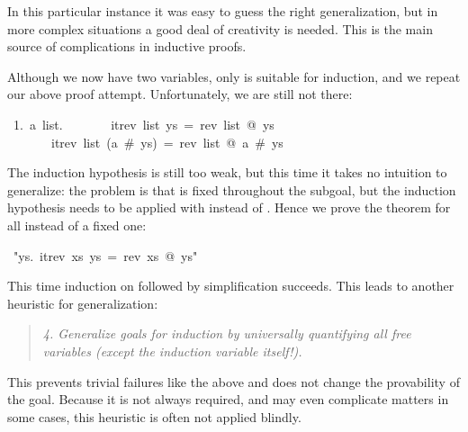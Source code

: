 \begin{isabelle}
\begin{isamarkuptxt}
In this particular instance it was easy to guess the right generalization,
but in more complex situations a good deal of creativity is needed. This is
the main source of complications in inductive proofs.

Although we now have two variables, only  is suitable for
induction, and we repeat our above proof attempt. Unfortunately, we are still
not there:
\begin{isabellepar}%
~1.~{\isasymAnd}a~list.\isanewline
~~~~~~~itrev~list~ys~=~rev~list~@~ys~{\isasymLongrightarrow}\isanewline
~~~~~~~itrev~list~(a~\#~ys)~=~rev~list~@~a~\#~ys%
\end{isabellepar}%
The induction hypothesis is still too weak, but this time it takes no
intuition to generalize: the problem is that  is fixed throughout
the subgoal, but the induction hypothesis needs to be applied with
 instead of . Hence we prove the theorem
for all  instead of a fixed one:%
\end{isamarkuptxt}%
~{"}{\isasymforall}ys.~itrev~xs~ys~=~rev~xs~@~ys{"}%
\begin{isamarkuptxt}%
\noindent
This time induction on  followed by simplification succeeds. This
leads to another heuristic for generalization:
\begin{quote}
{\em 4. Generalize goals for induction by universally quantifying all free
variables {\em(except the induction variable itself!)}.}
\end{quote}
This prevents trivial failures like the above and does not change the
provability of the goal. Because it is not always required, and may even
complicate matters in some cases, this heuristic is often not
applied blindly.%
\end{isamarkuptxt}%
\end{isabelle}%
